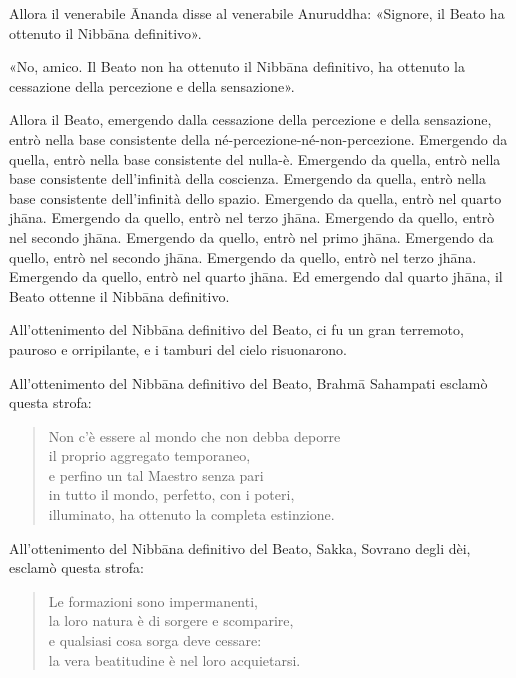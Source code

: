 Allora il venerabile Ānanda disse al venerabile Anuruddha: «Signore, il
Beato ha ottenuto il Nibbāna definitivo».


«No, amico. Il Beato non ha ottenuto il Nibbāna definitivo, ha ottenuto
la cessazione della percezione e della sensazione».


Allora il Beato, emergendo dalla cessazione della percezione e della
sensazione, entrò nella base consistente della
né-percezione-né-non-percezione. Emergendo da quella, entrò nella base
consistente del nulla-è. Emergendo da quella, entrò nella base
consistente dell’infinità della coscienza. Emergendo da quella, entrò
nella base consistente dell’infinità dello spazio. Emergendo da quella,
entrò nel quarto jhāna. Emergendo da quello, entrò nel terzo jhāna.
Emergendo da quello, entrò nel secondo jhāna. Emergendo da quello, entrò
nel primo jhāna. Emergendo da quello, entrò nel secondo jhāna. Emergendo
da quello, entrò nel terzo jhāna. Emergendo da quello, entrò nel quarto
jhāna. Ed emergendo dal quarto jhāna, il Beato ottenne il Nibbāna
definitivo.


All’ottenimento del Nibbāna definitivo del Beato, ci fu un gran
terremoto, pauroso e orripilante, e i tamburi del cielo risuonarono.


All’ottenimento del Nibbāna definitivo del Beato, Brahmā Sahampati
esclamò questa strofa:


\begin{quote}
Non c’è essere al mondo che non debba deporre \\
il proprio aggregato temporaneo, \\
e perfino un tal Maestro senza pari \\
in tutto il mondo, perfetto, con i poteri, \\
illuminato, ha ottenuto la completa estinzione.
\end{quote}



All’ottenimento del Nibbāna definitivo del Beato, Sakka, Sovrano degli
dèi, esclamò questa strofa:


\begin{quote}
Le formazioni sono impermanenti, \\
la loro natura è di sorgere e scomparire, \\
e qualsiasi cosa sorga deve cessare: \\
la vera beatitudine è nel loro acquietarsi.
\end{quote}



